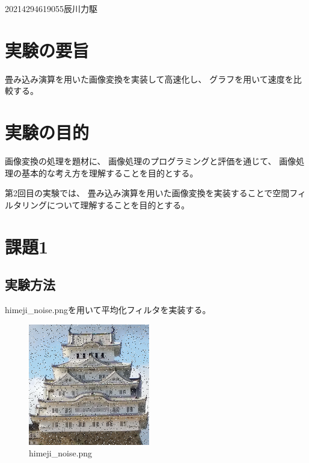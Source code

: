 \documentclass[12pt]{jarticle}
\begin{document}
{2021}{4}{29}{4619055}{辰川力駆}
\section{実験の要旨}

畳み込み演算を用いた画像変換を実装して高速化し、
グラフを用いて速度を比較する。

\section{実験の目的}

画像変換の処理を題材に、
画像処理のプログラミングと評価を通じて、
画像処理の基本的な考え方を理解することを目的とする。

第2回目の実験では、
畳み込み演算を用いた画像変換を実装することで空間フィルタリングについて理解することを目的とする。

\section{課題1}
\subsection{実験方法}

himeji\_noise.pngを用いて平均化フィルタを実装する。
\begin{figure}[h]
    \begin{center}
        \includegraphics[scale=0.7]{kadai4_2_3.png}
    \end{center}
    \caption{himeji\_noise.png}
\end{figure}
\end{document}
